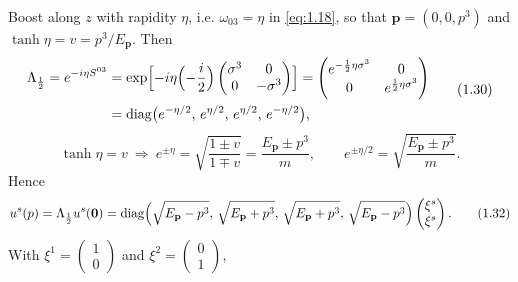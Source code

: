 \documentclass[11pt,a4paper]{article}
\begin{document}
Boost along $z$ with rapidity $\eta$, i.e. $\omega_{03}=\eta$ in \eqref{eq:1.18}, so that $\mathbf p=(0,0,p^3)$ and $\tanh\eta=v=p^3/E_{\mathbf p}$. Then
\begin{equation*}
\begin{aligned}
\Lambda_{\frac12}=e^{-i\eta S^{03}}
&=\exp\Bigl[-i\eta\Bigl(-\frac i2\Bigr)\begin{pmatrix}\sigma^3&0\\0&-\sigma^3\end{pmatrix}\Bigr]
=\begin{pmatrix}e^{-\frac12\eta\sigma^3}&0\\0&e^{\frac12\eta\sigma^3}\end{pmatrix}\\
&=\operatorname{diag}\bigl(e^{-\eta/2},\,e^{\eta/2},\,e^{\eta/2},\,e^{-\eta/2}\bigr),
\end{aligned}
\tag{1.30}\label{eq:1.30}
\end{equation*}
\begin{equation*}
\tanh\eta=v
\ \Longrightarrow\
e^{\pm\eta}=\sqrt{\frac{1\pm v}{1\mp v}}=\frac{E_{\mathbf p}\pm p^3}{m},
\qquad
e^{\pm\eta/2}=\sqrt{\frac{E_{\mathbf p}\pm p^3}{m}}.
\tag{1.31}\label{eq:1.31}
\end{equation*}
Hence
\begin{equation*}
u^s(p)=\Lambda_{\frac12}u^s(\mathbf 0)
=\operatorname{diag}\Bigl(\sqrt{E_{\mathbf p}-p^3},\,\sqrt{E_{\mathbf p}+p^3},\,\sqrt{E_{\mathbf p}+p^3},\,\sqrt{E_{\mathbf p}-p^3}\Bigr)
\begin{pmatrix}\xi^s\\\xi^s\end{pmatrix}.
\tag{1.32}\label{eq:1.32}
\end{equation*}
With $\xi^1=\begin{pmatrix}1\\0\end{pmatrix}$ and $\xi^2=\begin{pmatrix}0\\1\end{pmatrix}$,
\end{document}
